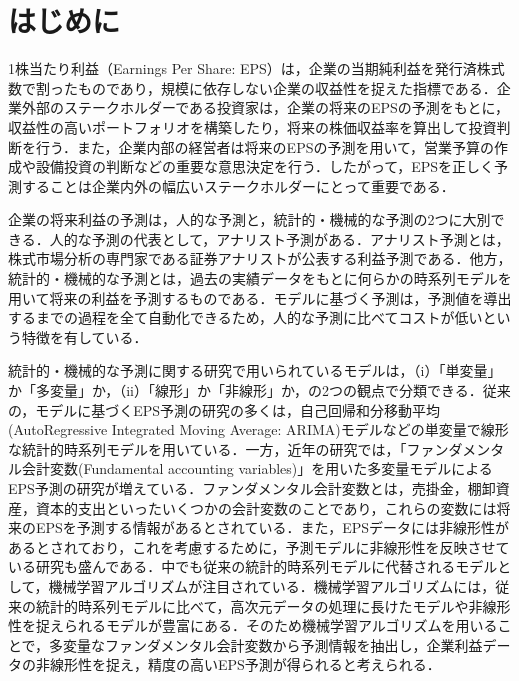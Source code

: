 \documentclass[a4paper，11pt]{jsarticle}
\begin{document}
\newpage
\tableofcontents

\newpage
{}
\maketitle
\part{はじめに}

1株当たり利益（Earnings Per Share: EPS）は，企業の当期純利益を発行済株式数で割ったものであり，規模に依存しない企業の収益性を捉えた指標である．企業外部のステークホルダーである投資家は，企業の将来のEPSの予測をもとに，収益性の高いポートフォリオを構築したり，将来の株価収益率を算出して投資判断を行う．また，企業内部の経営者は将来のEPSの予測を用いて，営業予算の作成や設備投資の判断などの重要な意思決定を行う．したがって，EPSを正しく予測することは企業内外の幅広いステークホルダーにとって重要である．

企業の将来利益の予測は，人的な予測と，統計的・機械的な予測の2つに大別できる．人的な予測の代表として，アナリスト予測がある．アナリスト予測とは，株式市場分析の専門家である証券アナリストが公表する利益予測である．他方，統計的・機械的な予測とは，過去の実績データをもとに何らかの時系列モデルを用いて将来の利益を予測するものである．モデルに基づく予測は，予測値を導出するまでの過程を全て自動化できるため，人的な予測に比べてコストが低いという特徴を有している\citep{sakurai1990}．

統計的・機械的な予測に関する研究で用いられているモデルは，（i）「単変量」か「多変量」か，（ii）「線形」か「非線形」か，の2つの観点で分類できる\citep{zhang2004neural}．従来の，モデルに基づくEPS予測の研究の多くは，自己回帰和分移動平均(AutoRegressive Integrated Moving Average: ARIMA)モデル\citep{box2015time}などの単変量で線形な統計的時系列モデルを用いている．一方，近年の研究では，「ファンダメンタル会計変数(Fundamental accounting variables)」を用いた多変量モデルによるEPS予測の研究が増えている．ファンダメンタル会計変数とは，売掛金，棚卸資産，資本的支出といったいくつかの会計変数のことであり，これらの変数には将来のEPSを予測する情報があるとされている\citep*{lev1993fundamental, abarbanell1997fundamental}．また，EPSデータには非線形性があるとされており\citep*{hopwood1986univariate}，これを考慮するために，予測モデルに非線形性を反映させている研究も盛んである．中でも従来の統計的時系列モデルに代替されるモデルとして，機械学習アルゴリズムが注目されている．機械学習アルゴリズムには，従来の統計的時系列モデルに比べて，高次元データの処理に長けたモデルや非線形性を捉えられるモデルが豊富にある\citep*{cao2020fundamental}．そのため機械学習アルゴリズムを用いることで，多変量なファンダメンタル会計変数から予測情報を抽出し，企業利益データの非線形性を捉え，精度の高いEPS予測が得られると考えられる．
\end{document}
